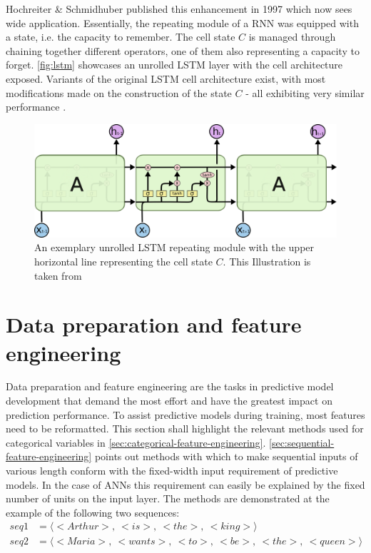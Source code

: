 Hochreiter \& Schmidhuber published this enhancement in 1997 \cite{hochreiter1997} which now sees wide application. Essentially, the repeating module of a RNN was equipped with a state, i.e. the capacity to remember. The cell state $C$ is managed through chaining together different operators, one of them also representing a capacity to forget. \autoref{fig:lstm} showcases an unrolled LSTM layer with the cell architecture exposed. Variants of the original LSTM cell architecture exist, with most modifications made on the construction of the state $C$ - all exhibiting very similar performance \cite{greff2017lstm}.

\begin{figure}[ht!]
    \centering
    \includegraphics[width=.8\textwidth]{gfx/lstm-chain.png}
    \caption{An exemplary unrolled LSTM repeating module with the upper horizontal line representing the cell state $C$. This Illustration is taken from \cite{web:colah}}
    \label{fig:lstm}
\end{figure}

\section{Data preparation and feature engineering}
\label{sec:background:feature-engineering}
Data preparation and feature engineering are the tasks in predictive model development that demand the most effort and have the greatest impact on prediction performance. To assist predictive models during training, most features need to be reformatted. This section shall highlight the relevant methods used for categorical variables in \autoref{sec:categorical-feature-engineering}. \autoref{sec:sequential-feature-engineering} points out methods with which to make sequential inputs of various length conform with the fixed-width input requirement of predictive models. In the case of ANNs this requirement can easily be explained by the fixed number of units on the input layer. The methods are demonstrated at the example of the following two sequences:
\begin{equation*}
    \begin{split}
        seq1 &= \langle<Arthur>,\ <is>,\ <the>,\ <king>\rangle\\
        seq2 &= \langle<Maria>,\ <wants>,\ <to>,\ <be>,\ <the>,\ <queen>\rangle
    \end{split}
\end{equation*}

